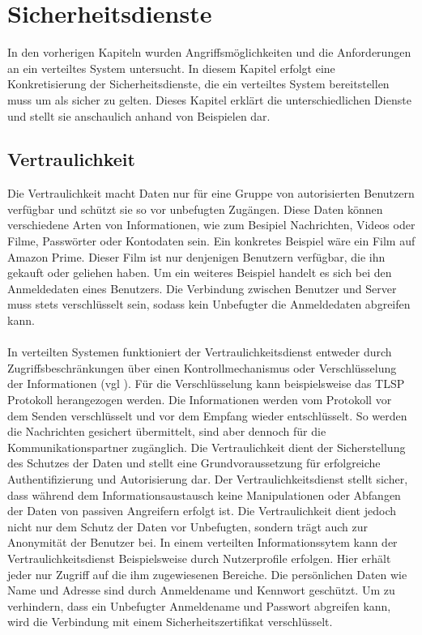 \documentclass[utf8,biblatex]{lni}
\begin{document}
\section{Sicherheitsdienste}\label{Sicherheitsdienste}

In den vorherigen Kapiteln wurden Angriffsmöglichkeiten und die Anforderungen an ein verteiltes System untersucht. In diesem Kapitel erfolgt eine Konkretisierung der Sicherheitsdienste, die
ein verteiltes System bereitstellen muss um als sicher zu gelten. Dieses Kapitel erklärt die unterschiedlichen Dienste und stellt sie anschaulich anhand von Beispielen dar.

\subsection{Vertraulichkeit}
Die Vertraulichkeit macht Daten nur für eine Gruppe von autorisierten Benutzern verfügbar und schützt sie so vor unbefugten Zugängen. Diese Daten können verschiedene Arten von Informationen,
wie zum Besipiel Nachrichten, Videos oder Filme, Passwörter oder Kontodaten sein. Ein konkretes Beispiel wäre ein Film auf Amazon Prime. Dieser Film ist nur denjenigen
Benutzern verfügbar, die ihn gekauft oder geliehen haben. Um ein weiteres Beispiel handelt es sich bei den Anmeldedaten eines Benutzers. Die Verbindung zwischen Benutzer
und Server muss stets verschlüsselt sein, sodass kein Unbefugter die Anmeldedaten abgreifen kann. \citet{Kriha.2008}
\\\\
In verteilten Systemen funktioniert der Vertraulichkeitsdienst  entweder durch Zugriffsbeschränkungen über einen Kontrollmechanismus oder Verschlüsselung der Informationen (vgl \citet{Mirhakkak.1993}).
Für die Verschlüsselung kann beispielsweise das TLSP Protokoll herangezogen werden. Die Informationen werden vom Protokoll vor dem Senden verschlüsselt und vor dem Empfang wieder entschlüsselt.
So werden die Nachrichten gesichert übermittelt, sind aber dennoch für die Kommunikationspartner zugänglich. Die Vertraulichkeit dient der Sicherstellung des Schutzes der Daten und stellt eine Grundvoraussetzung für erfolgreiche Authentifizierung
und Autorisierung dar. Der Vertraulichkeitsdienst stellt sicher, dass während dem Informationsaustausch keine Manipulationen oder Abfangen der Daten von passiven Angreifern erfolgt ist. \citet{Mirhakkak.1993}
Die Vertraulichkeit dient jedoch nicht nur dem Schutz der Daten vor Unbefugten, sondern trägt auch zur Anonymität der Benutzer bei.
In einem verteilten Informationssytem kann der Vertraulichkeitsdienst Beispielsweise durch Nutzerprofile erfolgen. Hier erhält jeder nur Zugriff auf die ihm zugewiesenen Bereiche. Die persönlichen Daten wie Name und
Adresse sind durch Anmeldename und Kennwort geschützt. Um zu verhindern, dass ein Unbefugter Anmeldename und Passwort abgreifen kann, wird die Verbindung mit einem Sicherheitszertifikat verschlüsselt.
\end{document}

